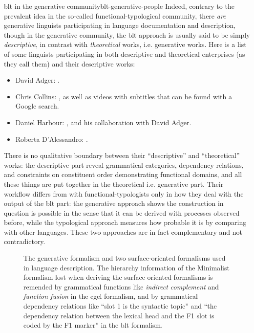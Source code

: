 \documentclass{article}
\newcommand*{\term}[1]{\emph{#1}}
\begin{document}
\begin{infobox}{\ac{blt} in the generative community}{blt-generative-people}
    Indeed, contrary to the prevalent idea in the so-called functional-typological community,
    there \emph{are} generative linguists participating in language documentation and description,
    though in the generative community, 
    the \ac{blt} approach is usually said to be simply \emph{descriptive},
    in contrast with \emph{theoretical} works, i.e. generative works.
    Here is a list of some linguists participating in 
    both descriptive and theoretical enterprises (as they call them)
    and their descriptive works:
    \begin{itemize}
        \item David Adger: \citet{adger1997vso,adger2006dialect,harbour2012information}.
        \item Chris Collins: \citet{collins2014plural,miller2007sounds}, 
        as well as videos with subtitles that can be found with a Google search.
        \item Daniel Harbour: \citet{watkins2010linguistic}, and his collaboration with David Adger.
        \item Roberta D'Alessandro: \citet{andriani2022documenting,frasson2021subject}.
    \end{itemize}
    There is no qualitative boundary between their ``descriptive'' and ``theoretical'' works:
    the descriptive part reveal grammatical categories, dependency relations,
    and constraints on constituent order demonstrating functional domains,
    and all these things are put together in the theoretical i.e. generative part.
    Their workflow differs from with functional-typologists only in 
    how they deal with the output of the \ac{blt} part:
    the generative approach shows the construction in question is possible 
    in the sense that it can be derived with processes observed before,
    while the typological approach measures how probable it is 
    by comparing with other languages.
    These two approaches are in fact complementary and not contradictory.
\end{infobox}

\begin{figure}
    \centering
    
    \caption{The generative formalism and two surface-oriented formalisms used in language description.
    The hierarchy information of the Minimalist formalism lost when deriving the surface-oriented formalisms 
    is remended by grammatical functions 
    like \term{indirect complement} and \term{function fusion} in the \ac{cgel} formalism,
    and by grammatical dependency relations like ``slot 1 is the syntactic topic''
    and ``the dependency relation between the lexical head and the F1 slot is coded by the F1 marker'' 
    in the \ac{blt} formalism.}
    \label{fig:three-formalism}
\end{figure}
\end{document}
